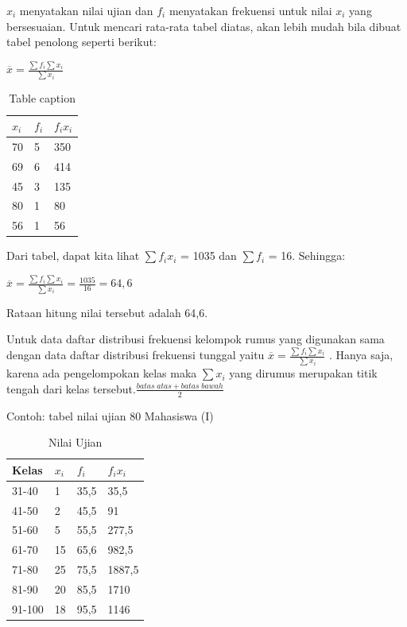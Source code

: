 \documentclass[11pt,fleqn]{book} %
\begin{document}
{$x_{i}$ menyatakan nilai ujian dan $f_{i}$ menyatakan frekuensi untuk nilai $x_{i}$ yang bersesuaian. Untuk mencari rata-rata tabel diatas, akan lebih mudah bila dibuat tabel penolong seperti berikut:


$\overline{x} = \frac{\sum f_{i}\sum x_{i}}{\sum x_{i}}$


\begin{table}[h]
\centering
\begin{tabular}{l l l}
\toprule
\textbf{$x_{i}$} & \textbf{$f_{i}$} & \textbf{$f_{i}x_{i}$}\\
\midrule
70 & 5 & 350 \\
69 & 6 & 414\\
45 & 3 & 135\\
80 & 1 & 80\\
56 & 1 & 56\\
\bottomrule
\end{tabular}
\caption{Table caption}
\end{table}

Dari tabel, dapat kita lihat $\sum f_{i}x_{i}$  = 1035 dan $\sum f_{i}$  = 16. Sehingga:

$ \overline{x} = \frac{\sum f_{i}\sum x_{i}}{\sum x_{i}} = \frac{1035}{16} = 64,6 $

Rataan hitung nilai tersebut adalah 64,6.


Untuk data daftar distribusi frekuensi kelompok rumus yang digunakan sama dengan data daftar distribusi frekuensi tunggal yaitu $\overline{x} = \frac{\sum f_{i}\sum x_{i}}{\sum x_{i}}$ . Hanya saja, karena ada pengelompokan kelas maka $\sum x_{i}$ yang dirumus merupakan titik tengah dari kelas tersebut.$\frac{batas\;atas + batas\;bawah}{2}$

Contoh: tabel nilai ujian 80 Mahasiswa (I)

\begin{table}[h]
\centering
\begin{tabular}{l l l l}
\toprule
\textbf{Kelas} & \textbf{$x_{i}$} & \textbf{$f_{i}$} & \textbf{$f_{i}x_{i}$}\\
\midrule
31-40 & 1 & 35,5 & 35,5 \\
41-50 & 2 & 45,5 & 91 \\
51-60 & 5 & 55,5 & 277,5\\
61-70 & 15 & 65,6 & 982,5\\
71-80 & 25 & 75,5 & 1887,5\\
81-90 & 20 & 85,5 & 1710\\
91-100 & 18 & 95,5 & 1146\\
\bottomrule
\end{tabular}
\caption{Nilai Ujian}
\end{table}

}
\end{document}

